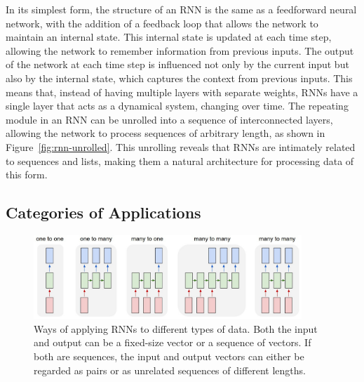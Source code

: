 \documentclass{article}
\newcommand{\reffig}[1]{Figure~\ref{#1}}
\begin{document}
In its simplest form, the structure of an RNN is the same as a feedforward neural network,
with the addition of a feedback loop that allows the network to maintain an internal
state. This internal state is updated at each time step, allowing the network to remember
information from previous inputs. The output of the network at each time step is
influenced not only by the current input but also by the internal state, which captures
the context from previous inputs. This means that, instead of having multiple layers with
separate weights, RNNs have a single layer that acts as a dynamical system, changing over
time. The repeating module in an RNN can be unrolled into a sequence of interconnected
layers, allowing the network to process sequences of arbitrary length, as shown in
\reffig{fig:rnn-unrolled}. This unrolling reveals that RNNs are intimately related to
sequences and lists, making them a natural architecture for processing data of this form.

\subsection{Categories of Applications}
\label{sec:2.0}

\begin{figure}[htbp]
  \centering
  \includegraphics[width=0.9\textwidth]{Karpathy application types.jpeg}
  \caption{Ways of applying RNNs to different types of data. Both the input and output can
    be a fixed-size vector or a sequence of vectors. If both are sequences, the input and
    output vectors can either be regarded as pairs or as unrelated sequences of different
    lengths. \cite{UnreasonableEffectivenessRecurrent}}
  \label{fig:rnn-application-types}
\end{figure}
\end{document}
